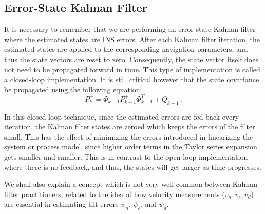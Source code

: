 \documentclass[journal]{IEEEtran}
\begin{document}
%
\subsection{Error-State Kalman Filter}
It is necessary to remember that we are performing an error-state Kalman filter where the estimated states are INS errors. After each Kalman filter iteration, the estimated states are applied to the corresponding navigation parameters, and thus the state vectors are reset to zero. Consequently, the state vector itself does not need to be propagated forward in time. This type of implementation is called a closed-loop implementation. It is still critical however that the state covariance be propagated using the following equation:
\begin{equation}
    P_k^-=\Phi_{k-1} P_{k-1}^+\Phi_{k-1}^T+Q_{k-1}\,.
\end{equation}

In this closed-loop technique, since the estimated  errors are fed back every iteration, the Kalman filter states are zeroed which keeps the errors of the filter small. This has the effect of minimizing the errors introduced in linearizing the system or process model, since higher order terms in the Taylor series expansion gets smaller and smaller. This is in contrast to  the open-loop implementation where there is no feedback, and thus, the states will get larger as time progresses.\par
We shall also explain a concept which is not very well common between Kalman filter practitioners, related to the idea of how velocity measurements ($v_n, v_e, v_d$) are essential in estimating  tilt errors $\psi_n$, $\psi_e$, and $\psi_d$.\par
\end{document}
